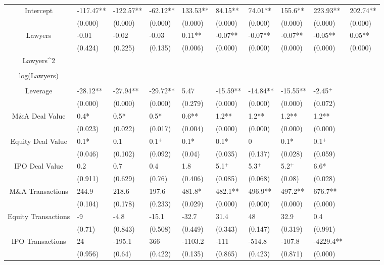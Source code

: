 \documentclass{article}
\begin{document}
\begin{table}[H]
\begin{tabular}{|clllllllll|}
Intercept & -117.47** & -122.57** & -62.12** & 133.53** & 84.15** & 74.01** & 155.6** & 223.93** & 202.74** \\
   & (0.000) & (0.000) & (0.000) & (0.000) & (0.000) & (0.000) & (0.000) & (0.000) & (0.000) \\
  Lawyers & -0.01 & -0.02 & -0.03 & 0.11** & -0.07** & -0.07** & -0.07** & -0.05** & 0.05** \\
   & (0.424) & (0.225) & (0.135) & (0.006) & (0.000) & (0.000) & (0.000) & (0.000) & (0.000) \\
  Lawyers^2 &  &  &  &  &  &  &  &  &  \\
   &  &  &  &  &  &  &  &  &  \\
  log(Lawyers) &  &  &  &  &  &  &  &  &  \\
   &  &  &  &  &  &  &  &  &  \\
  Leverage & -28.12** & -27.94** & -29.72** & 5.47 & -15.59** & -14.84** & -15.55** & -2.45$^{+}$ &  \\
   & (0.000) & (0.000) & (0.000) & (0.279) & (0.000) & (0.000) & (0.000) & (0.072) &  \\
  M\&A Deal Value & 0.4* & 0.5* & 0.5* & 0.6** & 1.2** & 1.2** & 1.2** & 1.2** &  \\
   & (0.023) & (0.022) & (0.017) & (0.004) & (0.000) & (0.000) & (0.000) & (0.000) &  \\
  Equity Deal Value & 0.1* & 0.1 & 0.1$^{+}$ & 0.1* & 0.1* & 0 & 0.1* & 0.1$^{+}$ &  \\
   & (0.046) & (0.102) & (0.092) & (0.04) & (0.035) & (0.137) & (0.028) & (0.059) &  \\
  IPO Deal Value & 0.2 & 0.7 & 0.4 & 1.8 & 5.1$^{+}$ & 5.3$^{+}$ & 5.2$^{+}$ & 6.6* &  \\
   & (0.911) & (0.629) & (0.76) & (0.406) & (0.085) & (0.068) & (0.08) & (0.028) &  \\
  M\&A Transactions & 244.9 & 218.6 & 197.6 & 481.8* & 482.1** & 496.9** & 497.2** & 676.7** &  \\
   & (0.104) & (0.178) & (0.233) & (0.029) & (0.000) & (0.000) & (0.000) & (0.000) &  \\
  Equity Transactions & -9 & -4.8 & -15.1 & -32.7 & 31.4 & 48 & 32.9 & 0.4 &  \\
   & (0.71) & (0.843) & (0.508) & (0.449) & (0.343) & (0.147) & (0.319) & (0.991) &  \\
  IPO Transactions & 24 & -195.1 & 366 & -1103.2 & -111 & -514.8 & -107.8 & -4229.4** &  \\
   & (0.956) & (0.64) & (0.422) & (0.135) & (0.865) & (0.423) & (0.871) & (0.000) &  \\

\end{tabular}
\end{table}
\end{document}
